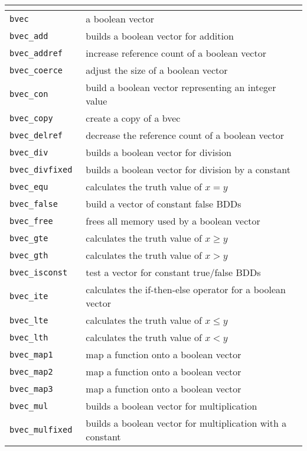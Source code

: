 \tabletail{\hline}
\begin{supertabular}{|l|l|} \hline
{} \\ \hline
{\tt bvec } & a boolean vector  \\\hline
{\tt bvec\_add } & builds a boolean vector for addition  \\\hline
{\tt bvec\_addref } & increase reference count of a boolean vector  \\\hline
{\tt bvec\_coerce } & adjust the size of a boolean vector  \\\hline
{\tt bvec\_con } & build a boolean vector representing an integer value  \\\hline
{\tt bvec\_copy } & create a copy of a bvec  \\\hline
{\tt bvec\_delref } & decrease the reference count of a boolean vector  \\\hline
{\tt bvec\_div } & builds a boolean vector for division  \\\hline
{\tt bvec\_divfixed } & builds a boolean vector for division by a constant  \\\hline
{\tt bvec\_equ } & calculates the truth value of $x = y$  \\\hline
{\tt bvec\_false } & build a vector of constant false BDDs  \\\hline
{\tt bvec\_free } & frees all memory used by a boolean vector  \\\hline
{\tt bvec\_gte } & calculates the truth value of $x \geq y$  \\\hline
{\tt bvec\_gth } & calculates the truth value of $x > y$  \\\hline
{\tt bvec\_isconst } & test a vector for constant true/false BDDs  \\\hline
{\tt bvec\_ite } & calculates the if-then-else operator for a boolean vector  \\\hline
{\tt bvec\_lte } & calculates the truth value of $x \leq y$  \\\hline
{\tt bvec\_lth } & calculates the truth value of $x < y$  \\\hline
{\tt bvec\_map1 } & map a function onto a boolean vector  \\\hline
{\tt bvec\_map2 } & map a function onto a boolean vector  \\\hline
{\tt bvec\_map3 } & map a function onto a boolean vector  \\\hline
{\tt bvec\_mul } & builds a boolean vector for multiplication  \\\hline
{\tt bvec\_mulfixed } & builds a boolean vector for multiplication with a constant  \\\hline

\end{supertabular}
